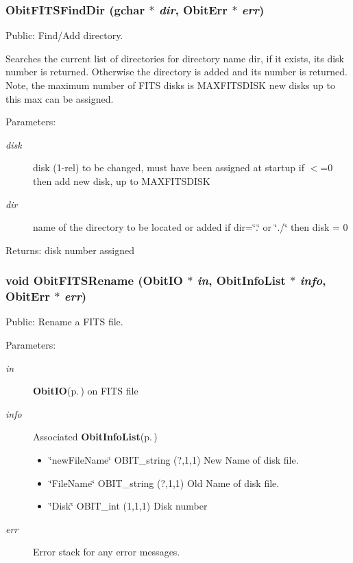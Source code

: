 \subsubsection{ Obit\-FITSFind\-Dir (gchar $\ast$ {\em dir}, {\bf Obit\-Err} $\ast$ {\em err})}\label{ObitFITS_8c_a6}


Public: Find/Add directory. 

Searches the current list of directories for directory name dir, if it exists, its disk number is returned. Otherwise the directory is added and its number is returned. Note, the maximum number of FITS disks is MAXFITSDISK new disks up to this max can be assigned. \begin{Desc}
\item[Parameters:]
\begin{description}
\item[{\em disk}]disk (1-rel) to be changed, must have been assigned at startup if $<$=0 then add new disk, up to MAXFITSDISK \item[{\em dir}]name of the directory to be located or added if dir=\char`\"{}.\char`\"{} or \char`\"{}./\char`\"{} then disk = 0 \end{description}
\end{Desc}
\begin{Desc}
\item[Returns:]disk number assigned \end{Desc}
\subsubsection{\setlength{\rightskip}{0pt plus 5cm}void Obit\-FITSRename ({\bf Obit\-IO} $\ast$ {\em in}, {\bf Obit\-Info\-List} $\ast$ {\em info}, {\bf Obit\-Err} $\ast$ {\em err})}\label{ObitFITS_8c_a10}


Public: Rename a FITS file. 

\begin{Desc}
\item[Parameters:]
\begin{description}
\item[{\em in}]{\bf Obit\-IO}{\rm (p.\,\pageref{structObitIO})} on FITS file \item[{\em info}]Associated {\bf Obit\-Info\-List}{\rm (p.\,\pageref{structObitInfoList})} \begin{itemize}
\item \char`\"{}new\-File\-Name\char`\"{} OBIT\_\-string (?,1,1) New Name of disk file. \item \char`\"{}File\-Name\char`\"{} OBIT\_\-string (?,1,1) Old Name of disk file. \item \char`\"{}Disk\char`\"{} OBIT\_\-int (1,1,1) Disk number \end{itemize}
\item[{\em err}]Error stack for any error messages. \end{description}
\end{Desc}
